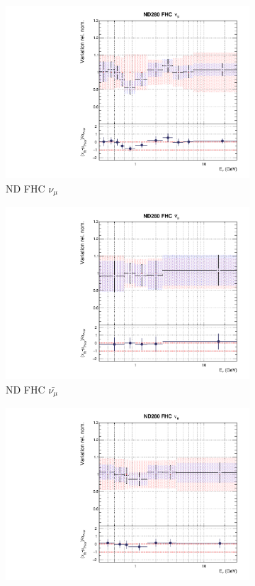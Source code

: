 \begin{figure}[t]
\begin{subfigure}{0.3\textwidth}
\end{subfigure}
\begin{subfigure}{0.45\textwidth}
  \centering
  \includegraphics[width=0.75\linewidth]{figs/rhcmpdat248flux_0}
  \caption{ND FHC $\nu_{\mu}$}
\end{subfigure}
\begin{subfigure}{0.45\textwidth}
  \centering
  \includegraphics[width=0.75\linewidth]{figs/rhcmpdat248flux_1}
  \caption{ND FHC $\bar{\nu_{\mu}}$}
\end{subfigure}
\begin{subfigure}{0.45\textwidth}
  \centering
  \includegraphics[width=0.75\linewidth]{figs/rhcmpdat248flux_2}

\end{subfigure}
\end{figure}
